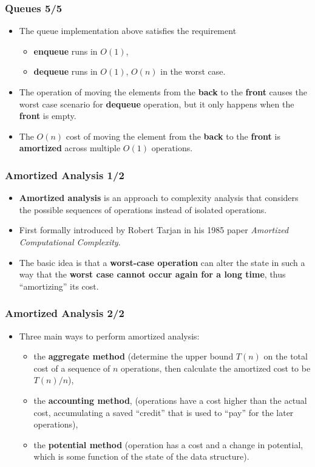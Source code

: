 \documentclass{beamer}
\begin{document}
\begin{frame}[fragile]
  \frametitle{Queues 5/5}
  \begin{itemize}
  \item The queue implementation above satisfies the requirement
    \begin{itemize}
    \item \textbf{enqueue} runs in $O(1)$,
    \item \textbf{dequeue} runs in $O(1)$, $O(n)$ in the worst case.
    \end{itemize}
  \item The operation of moving the elements from the \textbf{back} to the
    \textbf{front} causes the worst case scenario for \textbf{dequeue}
    operation, but it only happens when the \textbf{front} is empty.
  \item The $O(n)$ cost of moving the element from the \textbf{back} to the
    \textbf{front} is \textbf{amortized} across multiple $O(1)$ operations.
  \end{itemize}
\end{frame}

\begin{frame}[fragile]
  \frametitle{Amortized Analysis 1/2}
  \begin{itemize}
  \item \textbf{Amortized analysis} is an approach to complexity analysis that
    considers the possible sequences of operations instead of isolated
    operations.
  \item First formally introduced by Robert Tarjan in his 1985 paper
    \textit{Amortized Computational Complexity}.
  \item The basic idea is that a \textbf{worst-case operation} can alter the
    state in such a way that the \textbf{worst case cannot occur again for a
      long time}, thus ``amortizing'' its cost.
  \end{itemize}
\end{frame}

\begin{frame}[fragile]
  \frametitle{Amortized Analysis 2/2}
  \begin{itemize}
  \item Three main ways to perform amortized analysis:
    \begin{itemize}
    \item the \textbf{aggregate method} (determine the upper bound $T(n)$ on the
      total cost of a sequence of $n$ operations, then calculate the amortized
      cost to be $T(n) / n$),
    \item the \textbf{accounting method}, (operations have a cost higher than
      the actual cost, accumulating a saved ``credit'' that is used to ``pay''
      for the later operations),
    \item the \textbf{potential method} (operation has a cost and a change in
      potential, which is some function of the state of the data structure).
    \end{itemize}
  \end{itemize}
\end{frame}
\end{document}
